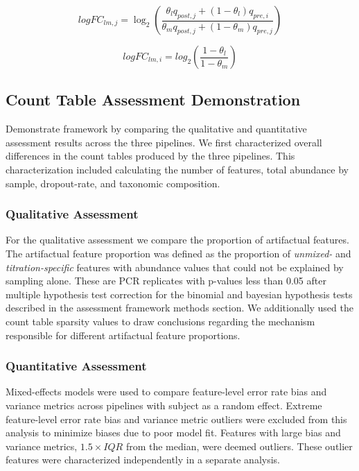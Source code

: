\documentclass[linenumbers]{bmcart}
\begin{document}
\begin{equation}
      logFC_{lm,j} = \log_2\left(\frac{\theta_l q_{post,j} + (1 - \theta_l) q_{pre,i}}{\theta_m q_{post,j} + (1 - \theta_m) q_{pre,j}}\right)
  \label{eq:expLogFC}
\end{equation}

\begin{equation}
      logFC_{lm,i} = log_2\left(\frac{1-\theta_l}{1-\theta_m}\right)
  \label{eq:expPreLogFC}
\end{equation}


\subsection*{Count Table Assessment Demonstration}
Demonstrate framework by comparing the qualitative and quantitative assessment results across the three pipelines.
We first characterized overall differences in the count tables produced by the three pipelines.
This characterization included calculating the number of features, total abundance by sample, dropout-rate, and taxonomic composition.

\subsubsection*{Qualitative Assessment}
For the qualitative assessment we compare the proportion of artifactual features.
The artifactual feature proportion was defined as the proportion of \emph{unmixed-} and \emph{titration-specific} features with abundance values that could not be explained by sampling alone.
These are PCR replicates with p-values less than 0.05 after multiple hypothesis test correction for the binomial and bayesian hypothesis tests described in the assessment framework methods section.
We additionally used the count table sparsity values to draw conclusions regarding the mechanism responsible for different artifactual feature proportions.

\subsubsection*{Quantitative Assessment}
Mixed-effects models were used to compare feature-level
error rate bias and variance metrics across pipelines with subject as a
random effect. Extreme feature-level error rate bias and variance metric
outliers were excluded from this analysis to minimize biases due to poor model fit. 
Features with large bias and variance metrics, \(1.5\times IQR\) from the median, were deemed outliers. 
These outlier features were characterized independently in a separate analysis. 
\end{document}

